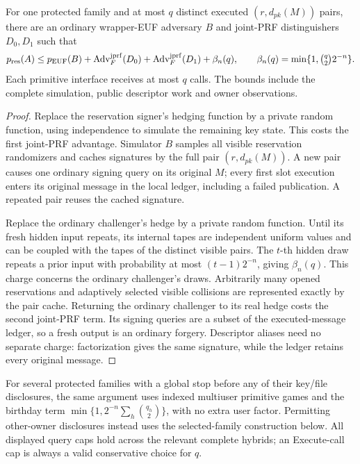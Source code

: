 \begin{proposition}
\label{prop:independent-hedging-bridge}
For one protected family and at most $q$ distinct executed
$(r,d_{pk}(M))$ pairs, there are an ordinary wrapper-EUF adversary $B$ and
joint-PRF distinguishers $D_0,D_1$ such that
\begin{equation}
 p_{\rm res}(A)\le p_{\rm EUF}(B)
   +\operatorname{Adv}^{\rm jprf}_F(D_0)
   +\operatorname{Adv}^{\rm jprf}_F(D_1)
   +\beta_n(q),\qquad
 \beta_n(q)=\min\{1,\tbinom q2 2^{-n}\}.
 \label{eq:independent-hedging-bridge}
\end{equation}
Each primitive interface receives at most $q$ calls. The bounds include
the complete simulation, public descriptor work and owner observations.
\end{proposition}
\begin{proof}
Replace the reservation signer's hedging function by a private random
function, using independence to simulate the remaining key state. This
costs the first joint-PRF advantage. Simulator $B$ samples all visible
reservation randomizers and caches signatures by the full pair
$(r,d_{pk}(M))$. A new pair causes one ordinary signing query on its
original $M$; every first slot execution enters its original message in
the local ledger, including a failed publication. A repeated pair reuses
the cached signature.

Replace the ordinary challenger's hedge by a private random function.
Until its fresh hidden input repeats, its internal tapes are independent
uniform values and can be coupled with the tapes of the distinct visible
pairs. The $t$-th hidden draw repeats a prior input with probability at
most $(t-1)2^{-n}$, giving $\beta_n(q)$. This charge concerns the ordinary
challenger's draws. Arbitrarily many opened reservations and adaptively
selected visible collisions are represented exactly by the pair cache.
Returning the ordinary challenger to its real hedge costs the second
joint-PRF term. Its signing queries are a subset of the executed-message
ledger, so a fresh output is an ordinary forgery. Descriptor aliases need
no separate charge: factorization gives the same signature, while the
ledger retains every original message.
\end{proof}

For several protected families with a global stop before any of their
key/file disclosures, the same argument uses indexed multiuser primitive
games and the birthday term
$\min\{1,2^{-n}\sum_h\binom{q_h}{2}\}$, with no extra user factor.
Permitting other-owner disclosures instead uses the selected-family
construction below. All displayed query caps hold across the relevant
complete hybrids; an Execute-call cap is always a valid conservative
choice for $q$.

